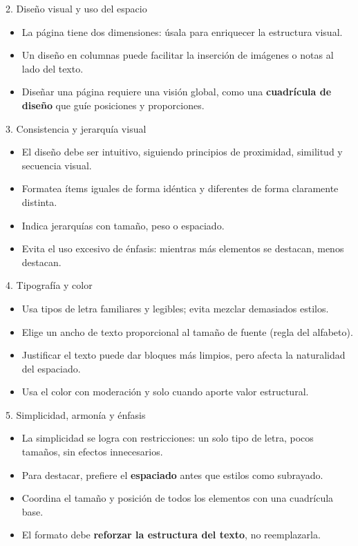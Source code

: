 \documentclass{beamer}
\begin{document}
\begin{frame}{2. Diseño visual y uso del espacio}
\begin{itemize}
    \item La página tiene dos dimensiones: úsala para enriquecer la estructura visual.
    \item Un diseño en columnas puede facilitar la inserción de imágenes o notas al lado del texto.
    \item Diseñar una página requiere una visión global, como una \textbf{cuadrícula de diseño} que guíe posiciones y proporciones.
\end{itemize}
\end{frame}

\begin{frame}{3. Consistencia y jerarquía visual}
\begin{itemize}
    \item El diseño debe ser intuitivo, siguiendo principios de proximidad, similitud y secuencia visual.
    \item Formatea ítems iguales de forma idéntica y diferentes de forma claramente distinta.
    \item Indica jerarquías con tamaño, peso o espaciado.
    \item Evita el uso excesivo de énfasis: mientras más elementos se destacan, menos destacan.
\end{itemize}
\end{frame}

\begin{frame}{4. Tipografía y color}
\begin{itemize}
    \item Usa tipos de letra familiares y legibles; evita mezclar demasiados estilos.
    \item Elige un ancho de texto proporcional al tamaño de fuente (regla del alfabeto).
    \item Justificar el texto puede dar bloques más limpios, pero afecta la naturalidad del espaciado.
    \item Usa el color con moderación y solo cuando aporte valor estructural.
\end{itemize}
\end{frame}

\begin{frame}{5. Simplicidad, armonía y énfasis}
\begin{itemize}
    \item La simplicidad se logra con restricciones: un solo tipo de letra, pocos tamaños, sin efectos innecesarios.
    \item Para destacar, prefiere el \textbf{espaciado} antes que estilos como subrayado.
    \item Coordina el tamaño y posición de todos los elementos con una cuadrícula base.
    \item El formato debe \textbf{reforzar la estructura del texto}, no reemplazarla.
\end{itemize}
\end{frame}
\end{document}
